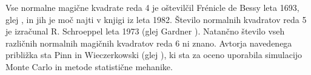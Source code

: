 \documentclass[a4paper,12pt]{article}
\begin{document}
Vse normalne magične kvadrate reda 4 je oštevilčil Frénicle de Bessy
leta 1693, glej \cite{bessy}, in jih je moč najti v knjigi \cite{berlekamp}
iz leta 1982. Število normalnih kvadratov reda 5 je izračunal
R. Schroeppel leta 1973 (glej Gardner \cite{gardner}).
Natančno število vseh različnih normalnih magičnih kvadratov reda 6 ni znano.
Avtorja navedenega približka sta Pinn in Wieczerkowski (glej \cite{pinn}), ki
sta za oceno uporabila simulacijo Monte Carlo in metode statistične mehanike.


\newpage



\end{document}
